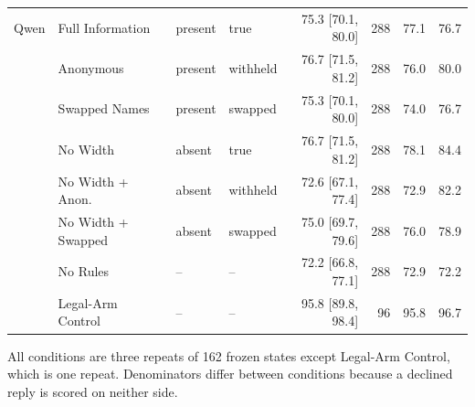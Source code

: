 \begin{table}[H]
\begin{tabular}{llllrrrr}
    Qwen & Full Information & present & true & 75.3 [70.1, 80.0] & 288 & 77.1 & 76.7 \\
     & Anonymous & present & withheld & 76.7 [71.5, 81.2] & 288 & 76.0 & 80.0 \\
     & Swapped Names & present & swapped & 75.3 [70.1, 80.0] & 288 & 74.0 & 76.7 \\
     & No Width & absent & true & 76.7 [71.5, 81.2] & 288 & 78.1 & 84.4 \\
     & No Width + Anon. & absent & withheld & 72.6 [67.1, 77.4] & 288 & 72.9 & 82.2 \\
     & No Width + Swapped & absent & swapped & 75.0 [69.7, 79.6] & 288 & 76.0 & 78.9 \\
     & No Rules & -- & -- & 72.2 [66.8, 77.1] & 288 & 72.9 & 72.2 \\
     & Legal-Arm Control & -- & -- & 95.8 [89.8, 98.4] & 96 & 95.8 & 96.7 \\
    \bottomrule
  \end{tabular}
  \begin{minipage}{\linewidth}\vspace{2pt}\footnotesize All conditions are three repeats of 162 frozen states except Legal-Arm Control, which is one repeat. Denominators differ between conditions because a declined reply is scored on neither side.\end{minipage}
\end{table}
